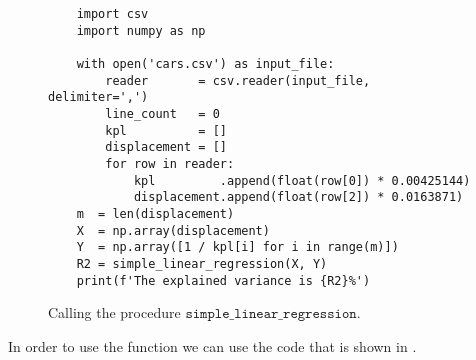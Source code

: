 \begin{figure}[!ht]
\centering
\begin{verbatim}
    import csv
    import numpy as np
    
    with open('cars.csv') as input_file:
        reader       = csv.reader(input_file, delimiter=',')
        line_count   = 0
        kpl          = []
        displacement = []
        for row in reader:
            kpl         .append(float(row[0]) * 0.00425144) 
            displacement.append(float(row[2]) * 0.0163871)  
    m  = len(displacement)
    X  = np.array(displacement)
    Y  = np.array([1 / kpl[i] for i in range(m)])
    R2 = simple_linear_regression(X, Y)
    print(f'The explained variance is {R2}%')
\end{verbatim}
\vspace*{-0.3cm}
\caption{Calling the procedure $\mathtt{simple\_linear\_regression}$.}
\label{fig:simple_linear_regression.py:test}
\end{figure}
In order to use the function we can use the code that is shown in 
.
